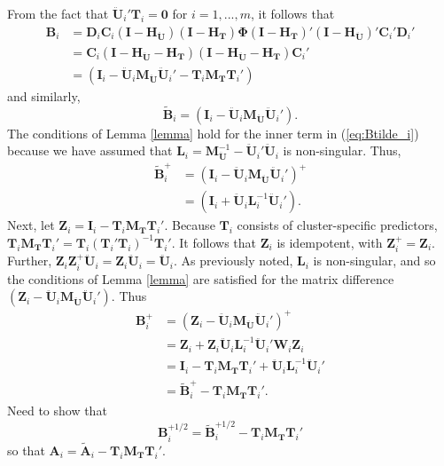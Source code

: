 \documentclass[12pt]{article}
\begin{document}
From the fact that \(\mathbf{\ddot{U}}_i'\mathbf{T}_i = \mathbf{0}\) for
\(i = 1,...,m\), it follows that \begin{align}
\mathbf{B}_i &= \mathbf{D}_i \mathbf{C}_i \left(\mathbf{I} - \mathbf{H_{\ddot{U}}}\right) \left(\mathbf{I} - \mathbf{H_T}\right) \boldsymbol\Phi \left(\mathbf{I} - \mathbf{H_T}\right)' \left(\mathbf{I} - \mathbf{H_{\ddot{U}}}\right)' \mathbf{C}_i' \mathbf{D}_i' \nonumber \\ 
&= \mathbf{C}_i \left(\mathbf{I} - \mathbf{H_{\ddot{U}}} - \mathbf{H_T}\right) \left(\mathbf{I} - \mathbf{H_{\ddot{U}}} - \mathbf{H_T}\right) \mathbf{C}_i' \nonumber\\ 
\label{eq:B_i}
&= \left(\mathbf{I}_i - \mathbf{\ddot{U}}_i \mathbf{M_{\ddot{U}}}\mathbf{\ddot{U}}_i' - \mathbf{T}_i \mathbf{M_T}\mathbf{T}_i'\right)
\end{align} and similarly, \begin{equation}
\label{eq:Btilde_i}
\tilde{\mathbf{B}}_i = \left(\mathbf{I}_i - \mathbf{\ddot{U}}_i \mathbf{M_{\ddot{U}}}\mathbf{\ddot{U}}_i'\right).
\end{equation} The conditions of Lemma \ref{lemma} hold for the inner
term in (\ref{eq:Btilde_i}) because we have assumed that
\(\mathbf{L}_i = \mathbf{M}_\mathbf{\ddot{U}}^{-1} - \mathbf{\ddot{U}}_i' \mathbf{\ddot{U}}_i\)
is non-singular. Thus, \begin{align}
\tilde{\mathbf{B}}_i^+ &= \left(\mathbf{I}_i - \mathbf{\ddot{U}}_i \mathbf{M_{\ddot{U}}}\mathbf{\ddot{U}}_i'\right)^+ \nonumber \\
&= \left(\mathbf{I}_i + \mathbf{\ddot{U}}_i \mathbf{L}_i^{-1} \mathbf{\ddot{U}}_i'\right).
\end{align} Next, let
\(\mathbf{Z}_i = \mathbf{I}_i - \mathbf{T}_i \mathbf{M_T}\mathbf{T}_i'\).
Because \(\mathbf{T}_i\) consists of cluster-specific predictors,
\(\mathbf{T}_i \mathbf{M_T} \mathbf{T}_i' = \mathbf{T}_i \left(\mathbf{T}_i'\mathbf{T}_i\right)^{-1} \mathbf{T}_i'\).
It follows that \(\mathbf{Z}_i\) is idempotent, with
\(\mathbf{Z}_i^+ = \mathbf{Z}_i\). Further,
\(\mathbf{Z}_i \mathbf{Z}_i^+ \mathbf{\ddot{U}}_i = \mathbf{Z}_i \mathbf{\ddot{U}}_i = \mathbf{\ddot{U}}_i\).
As previously noted, \(\mathbf{L}_i\) is non-singular, and so the
conditions of Lemma \ref{lemma} are satisfied for the matrix difference
\((\mathbf{Z}_i - \mathbf{\ddot{U}}_i \mathbf{M_{\ddot{U}}}\mathbf{\ddot{U}}_i')\).
Thus \begin{align}
\mathbf{B}_i^+ &= (\mathbf{Z}_i - \mathbf{\ddot{U}}_i \mathbf{M_{\ddot{U}}}\mathbf{\ddot{U}}_i')^+ \nonumber \\ 
&= \mathbf{Z}_i + \mathbf{Z}_i \mathbf{\ddot{U}}_i \mathbf{L}_i^{-1} \mathbf{\ddot{U}}_i' \mathbf{W}_i \mathbf{Z}_i \nonumber \\
&= \mathbf{I}_i - \mathbf{T}_i \mathbf{M_T}\mathbf{T}_i' + \mathbf{\ddot{U}}_i \mathbf{L}_i^{-1} \mathbf{\ddot{U}}_i' \nonumber \\ 
&= \tilde{\mathbf{B}}_i^+ - \mathbf{T}_i \mathbf{M_T}\mathbf{T}_i'.
\end{align} Need to show that \[
\mathbf{B}_i^{+1/2} = \tilde{\mathbf{B}}_i^{+1/2} - \mathbf{T}_i \mathbf{M_T}\mathbf{T}_i'
\] so that
\(\mathbf{A}_i = \tilde{\mathbf{A}}_i - \mathbf{T}_i \mathbf{M_T}\mathbf{T}_i'\).
\end{document}
